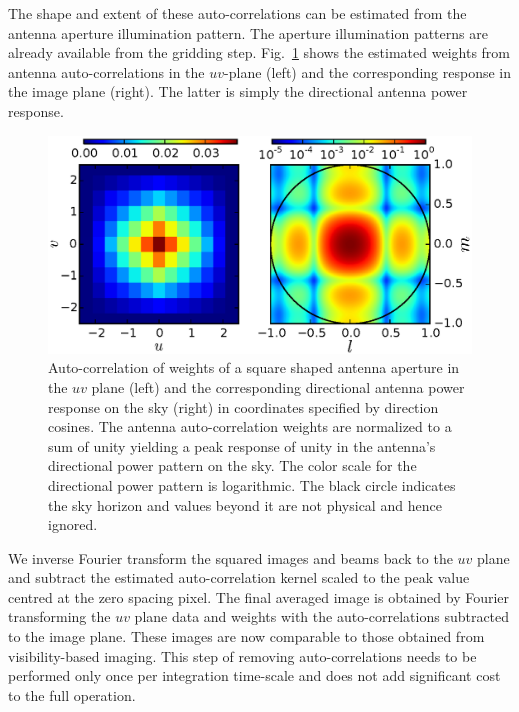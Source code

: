 \documentclass[a4paper,fleqn,usenatbib]{mnras}
\begin{document}
The shape and extent of these auto-correlations can be estimated from the 
antenna aperture illumination pattern. The aperture illumination patterns
are already available from the gridding step. Fig.~\ref{fig:autocorr_wts_PB} 
shows the estimated weights from antenna auto-correlations in the $uv$-plane 
(left) and the corresponding response in the image plane (right). The latter 
is simply the directional antenna power response. 

\begin{figure}
  \includegraphics[width=\columnwidth]{figure4}
  \caption{Auto-correlation of weights of a square shaped antenna aperture
    in the $uv$ plane (left) and the corresponding directional antenna power 
    response on the sky (right) in coordinates specified by direction cosines. 
    The antenna auto-correlation weights are normalized to a sum
    of unity yielding a peak response of unity in the antenna's directional
    power pattern on the sky. The color scale for the directional power 
    pattern is logarithmic. The black circle indicates the sky horizon and
    values beyond it are not physical and hence ignored.}
  \label{fig:autocorr_wts_PB}
\end{figure}

We inverse Fourier transform the squared images and beams back to the $uv$ plane and subtract the estimated auto-correlation kernel scaled to the peak value centred at the zero spacing pixel. The final averaged image is obtained by Fourier transforming the $uv$ plane data and weights with the auto-correlations subtracted to the image plane. These images are now comparable to those obtained from visibility-based imaging. This step of removing auto-correlations needs to be performed only once per integration time-scale and does not add significant cost to the full operation.
\end{document}
